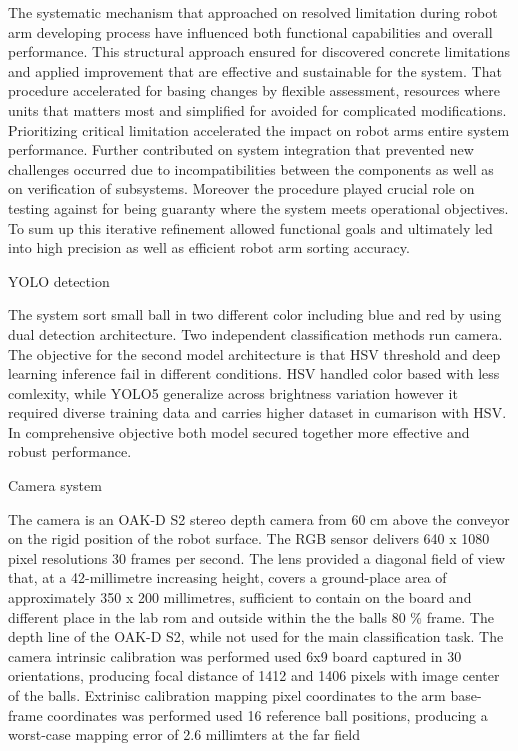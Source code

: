  The systematic mechanism that approached on resolved limitation during robot arm developing process have influenced both functional capabilities and overall performance. This structural approach ensured for discovered  concrete limitations and applied improvement that are effective and sustainable for the system. That procedure accelerated for basing changes by flexible assessment, resources where units that matters most and simplified for avoided for complicated modifications. Prioritizing critical limitation accelerated the impact on robot arms entire system performance. Further contributed on system integration that prevented new challenges occurred due to incompatibilities between the components as well as on verification of subsystems. Moreover the procedure played crucial role on testing  against for being guaranty where the  system meets operational objectives. To sum up this iterative refinement allowed functional goals and  ultimately led into high precision as well as efficient robot arm sorting accuracy.


 YOLO detection 

The system sort small ball in two different color including blue and red by using dual detection architecture. Two independent classification methods run camera. The objective for the second model architecture is that HSV threshold and deep learning inference fail in different conditions. HSV handled color based with less comlexity, while YOLO5 generalize across brightness variation however it required diverse training data and carries higher dataset in cumarison with HSV. In comprehensive objective both model secured together more effective and robust performance.

 Camera system 

The camera is an OAK-D S2 stereo depth camera from 60 cm above the conveyor on the rigid position of the robot surface. The RGB sensor delivers 640 x 1080 pixel resolutions  30 frames per second. The lens provided a diagonal field of view that, at a 42-millimetre increasing height, covers a ground-place area of approximately 350 x 200 millimetres, sufficient to contain on the board and different place in the lab rom and outside within the the balls 80 \% frame. The depth line of the OAK-D S2, while not used for the main classification task. The camera intrinsic calibration was performed used 6x9 board captured in 30 orientations, producing focal distance of 1412 and 1406 pixels with image center of the balls. Extrinisc calibration mapping pixel coordinates to the arm base-frame coordinates was performed used 16 reference ball positions, producing a worst-case mapping error of 2.6 millimters at the far field 

